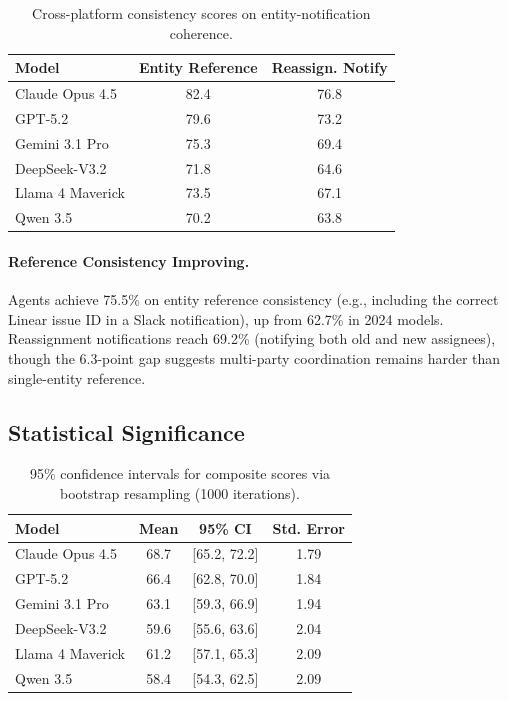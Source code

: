 \documentclass{article}
\begin{document}
\begin{table}[h]
\centering
\caption{Cross-platform consistency scores on entity-notification coherence.}
\label{tab:crossplatform}
\begin{tabular}{lcc}
\toprule
\textbf{Model} & \textbf{Entity Reference} & \textbf{Reassign. Notify} \\
\midrule
Claude Opus 4.5 & 82.4 & 76.8 \\
GPT-5.2 & 79.6 & 73.2 \\
Gemini 3.1 Pro & 75.3 & 69.4 \\
DeepSeek-V3.2 & 71.8 & 64.6 \\
Llama 4 Maverick & 73.5 & 67.1 \\
Qwen 3.5 & 70.2 & 63.8 \\
\bottomrule
\end{tabular}
\end{table}

\paragraph{Reference Consistency Improving.} Agents achieve 75.5\% on entity reference consistency (e.g., including the correct Linear issue ID in a Slack notification), up from 62.7\% in 2024 models. Reassignment notifications reach 69.2\% (notifying both old and new assignees), though the 6.3-point gap suggests multi-party coordination remains harder than single-entity reference.

\subsection{Statistical Significance}

\begin{table}[h]
\centering
\caption{95\% confidence intervals for composite scores via bootstrap resampling (1000 iterations).}
\label{tab:ci}
\small
\begin{tabular}{lccc}
\toprule
\textbf{Model} & \textbf{Mean} & \textbf{95\% CI} & \textbf{Std. Error} \\
\midrule
Claude Opus 4.5 & 68.7 & [65.2, 72.2] & 1.79 \\
GPT-5.2 & 66.4 & [62.8, 70.0] & 1.84 \\
Gemini 3.1 Pro & 63.1 & [59.3, 66.9] & 1.94 \\
DeepSeek-V3.2 & 59.6 & [55.6, 63.6] & 2.04 \\
Llama 4 Maverick & 61.2 & [57.1, 65.3] & 2.09 \\
Qwen 3.5 & 58.4 & [54.3, 62.5] & 2.09 \\
\bottomrule
\end{tabular}
\end{table}
\end{document}
